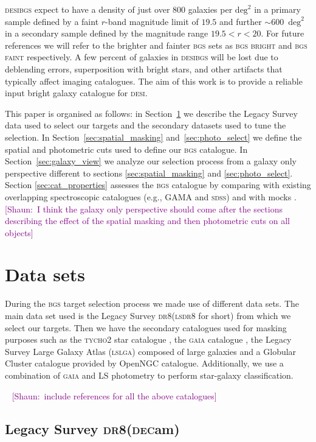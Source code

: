 \documentclass[fleqn,usenatbib]{mnras}
\newcommand{\shaun}[1]{~\newline\noindent \textcolor{Purple}{{ [Shaun:~{#1}]\\}}}
\newcommand{\BGSB}{\textsc{bgs bright}\xspace}
\newcommand{\BGSF}{\textsc{bgs faint}\xspace}
\newcommand{\BGS}{\textsc{bgs}\xspace}
\newcommand{\DECam}{\textsc{dec}am\xspace}
\newcommand{\DESI}{\textsc{desi}\xspace}
\newcommand{\DReight}{\textsc{dr8}\xspace}
\newcommand{\GAIA}{\textsc{gaia}\xspace}
\newcommand{\LS}{\textsc{ls}\xspace}
\newcommand{\LSLGA}{\textsc{lslga}\xspace}
\newcommand{\SDSS}{\textsc{sdss}\xspace}
\newcommand{\TYCHO}{\textsc{tycho2}\xspace}
\begin{document}
\DESI \BGS expect to have a density of just over $800$ galaxies per $\textrm{deg}^2$ in a primary sample defined by a faint $r$-band magnitude limit of $19.5$ and further $\sim 600$~$\textrm{deg}^2$ in a secondary sample defined by the magnitude range $19.5 < r < 20$. For future references we will refer to the brighter and fainter \BGS sets as \BGSB and \BGSF respectively. A few percent of galaxies in \DESI \BGS will be lost due to deblending errors, superposition with bright stars, and other artifacts that typically affect imaging catalogues. The aim of this work is to provide a reliable input bright galaxy catalogue for \DESI. 

This paper is organised as follows: in Section~\ref{sec:data_sets} we describe the Legacy Survey data used to select our targets and the secondary datasets used to tune the selection. In Section~\ref{sec:spatial_masking} and~\ref{sec:photo_select} we define the spatial and photometric cuts used to define our \BGS catalogue. In Section~\ref{sec:galaxy_view} we analyze our selection process from a galaxy only perspective different to sections \ref{sec:spatial_masking} and \ref{sec:photo_select}. Section \ref{sec:cat_properties} assesses the \BGS catalogue by comparing with existing overlapping spectroscopic catalogues (e.g., GAMA and \SDSS) and with mocks \citep{Smith:2017tzz}.
\shaun{I think the galaxy only perspective should come after the sections 
describing the effect of the spatial masking and then photometric cuts on all objects}

\section{Data sets}\label{sec:data_sets}

During the \BGS target selection process we made use of different data sets. The main data set used is the Legacy Survey \DReight (\LS \DReight for short) from which we select our targets. Then we have the secondary catalogues used for masking purposes such as the \TYCHO star catalogue \citep{2000A&A...355L..27H}, the \GAIA catalogue \citep{2016A&A...595A...1G}, the Legacy Survey Large Galaxy Atlas (\LSLGA) composed of large galaxies \citep[in prep.]{} and a Globular Cluster catalogue provided by OpenNGC catalogue. Additionally, we use a combination of \GAIA and LS photometry to perform star-galaxy classification.

\shaun{include references for all the above catalogues} 


\subsection{Legacy Survey \DReight (\DECam)}
\end{document}

